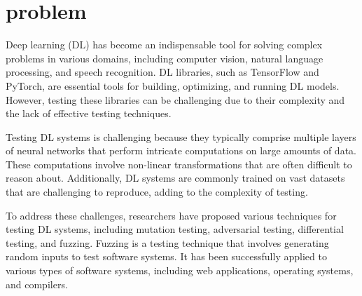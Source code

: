 \documentclass[sigconf]{acmart}
\begin{document}


\maketitle

\section{problem}
\par Deep learning (DL) has become an indispensable tool for solving complex problems in various domains, including computer vision, natural language processing, and speech recognition. 
DL libraries, such as TensorFlow and PyTorch, are essential tools for building, optimizing, and running DL models. 
However, testing these libraries can be challenging due to their complexity and the lack of effective testing techniques.

\par Testing DL systems is challenging because they typically comprise multiple layers of neural networks that perform intricate computations on large amounts of data. 
These computations involve non-linear transformations that are often difficult to reason about. Additionally, DL systems are commonly trained on vast datasets that are challenging to reproduce, adding to the complexity of testing.

\par To address these challenges, researchers have proposed various techniques for testing DL systems, including mutation testing, adversarial testing, differential testing, and fuzzing. 
Fuzzing is a testing technique that involves generating random inputs to test software systems. It has been successfully applied to various types of software systems, including web applications, operating systems, and compilers.
\end{document}
